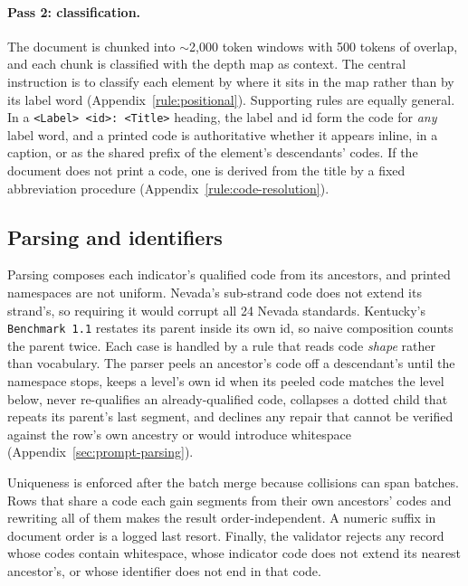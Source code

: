 \documentclass[11pt]{article}
\begin{document}
\paragraph{Pass 2: classification.} The document is chunked into ${\sim}$2{,}000
token windows with 500 tokens of overlap, and each chunk is classified with the
depth map as context. The central instruction is to classify each element by where it sits in the map rather than by its label word
(Appendix~\ref{rule:positional}). Supporting rules are equally general. In a \texttt{<Label> <id>: <Title>} heading, the label and id form the code for \emph{any} label word, and a printed code is authoritative whether it appears inline, in a
caption, or as the shared prefix of the element's descendants' codes. If the document does not print a code, one is derived from the title by a fixed
abbreviation procedure (Appendix~\ref{rule:code-resolution}).

\subsection{Parsing and identifiers}
\label{sec:method-parsing}



Parsing composes each indicator's qualified code from its ancestors, and printed namespaces are not uniform. Nevada's sub-strand code does not extend its strand's, so requiring it would corrupt all 24 Nevada standards. Kentucky's \texttt{Benchmark 1.1} restates its parent inside its own id, so naive composition counts the parent twice. Each case is handled by a rule that reads code \emph{shape} rather than vocabulary. The parser peels an ancestor's code off a descendant's until the namespace stops, keeps a level's own id when its peeled code matches the level below, never re-qualifies an already-qualified code, collapses a dotted child that repeats its parent's last segment, and declines any repair that cannot be verified against the row's own ancestry or would introduce whitespace (Appendix~\ref{sec:prompt-parsing}).

Uniqueness is enforced after the batch merge because collisions can span batches. Rows that share a code each gain segments from their own ancestors' codes and rewriting all of them makes the result order-independent. A numeric suffix in document order is a logged last resort. Finally, the validator rejects any record whose codes contain whitespace, whose indicator code does not extend its nearest ancestor's, or whose identifier does not end in that code.
\end{document}
